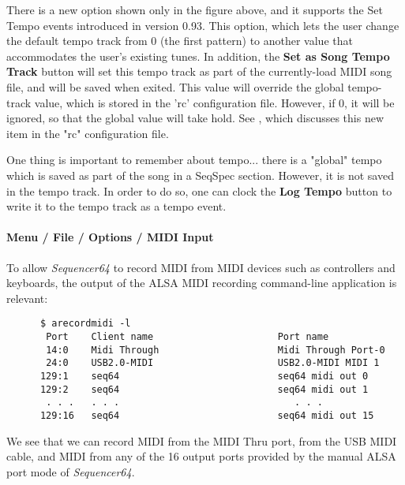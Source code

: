    There is a new option shown only in the figure above, and it supports the
   Set Tempo events introduced in version 0.93.  This option, which lets the
   user change the default tempo track from 0 (the first pattern) to another
   value that accommodates the user's existing tunes.
   In addition, the \textbf{Set as Song Tempo Track} button will set this tempo
   track as part of the currently-load MIDI song file, and will be saved when
   exited.  This value will override the global tempo-track value, which is
   stored in the 'rc' configuration file.  However, if 0, it will be ignored,
   so that the global value will take hold.
   See , which discusses this
   new item in the "rc" configuration file.

   One thing is important to remember about tempo...
   there is a "global" tempo which is saved as part of the song in a SeqSpec
   section.  However, it is not saved in the tempo track.  In order to do so,
   one can clock the \textbf{Log Tempo} button to write it to the tempo track
   as a tempo event.

\paragraph{Menu / File / Options / MIDI Input}
\label{paragraph:seq64_menu_file_options_midi_input}

   To allow \textsl{Sequencer64} to record MIDI from MIDI devices such as
   controllers and keyboards, the output of the ALSA MIDI recording
   command-line application is relevant:

   \begin{verbatim}
      $ arecordmidi -l
       Port    Client name                      Port name
       14:0    Midi Through                     Midi Through Port-0
       24:0    USB2.0-MIDI                      USB2.0-MIDI MIDI 1
      129:1    seq64                            seq64 midi out 0
      129:2    seq64                            seq64 midi out 1
       . . .   . . .                               . . .
      129:16   seq64                            seq64 midi out 15
   \end{verbatim}


   We see that we can record MIDI from the MIDI Thru port, from the USB MIDI
   cable, and MIDI from any of the 16 output ports provided by the manual ALSA
   port mode of \textsl{Sequencer64}.

